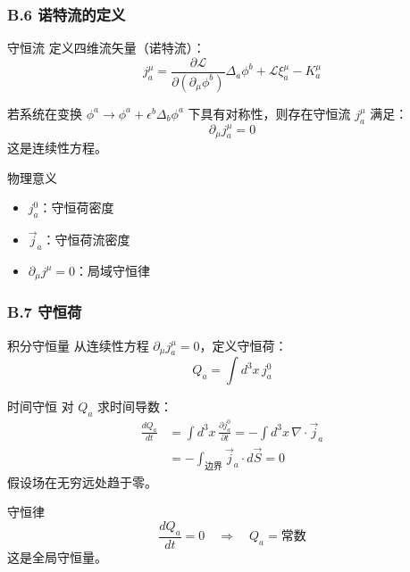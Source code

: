 \documentclass[xcolor=dvipsnames]{ctexbeamer}
\begin{document}
\begin{frame}
\frametitle{B.6 诺特流的定义}
\begin{block}{守恒流}
定义四维流矢量（诺特流）：
$$\boxed{j^\mu_a = \frac{\partial\mathcal{L}}{\partial(\partial_\mu\phi^b)}\Delta_a\phi^b + \mathcal{L}\xi^\mu_a - K^\mu_a}$$
\end{block}

\pause

\begin{theorem}[场论中的诺特定理]
若系统在变换 $\phi^a \to \phi^a + \epsilon^b\Delta_b\phi^a$ 下具有对称性，则存在守恒流 $j^\mu_a$ 满足：
$$\boxed{\partial_\mu j^\mu_a = 0}$$
这是连续性方程。
\end{theorem}

\pause

\begin{block}{物理意义}
\begin{itemize}
\item $j^0_a$：守恒荷密度
\item $\vec{j}_a$：守恒荷流密度
\item $\partial_\mu j^\mu = 0$：局域守恒律
\end{itemize}
\end{block}
\end{frame}

\begin{frame}
\frametitle{B.7 守恒荷}
\begin{block}{积分守恒量}
从连续性方程 $\partial_\mu j^\mu_a = 0$，定义守恒荷：
$$Q_a = \int d^3x \, j^0_a$$
\end{block}

\pause

\begin{block}{时间守恒}
对 $Q_a$ 求时间导数：
\begin{align*}
\frac{dQ_a}{dt} &= \int d^3x \, \frac{\partial j^0_a}{\partial t} = -\int d^3x \, \nabla \cdot \vec{j}_a \\
&= -\int_{\text{边界}} \vec{j}_a \cdot d\vec{S} = 0
\end{align*}
假设场在无穷远处趋于零。
\end{block}

\pause

\begin{alertblock}{守恒律}
$$\boxed{\frac{dQ_a}{dt} = 0 \quad \Rightarrow \quad Q_a = \text{常数}}$$
这是全局守恒量。
\end{alertblock}
\end{frame}
\end{document}
